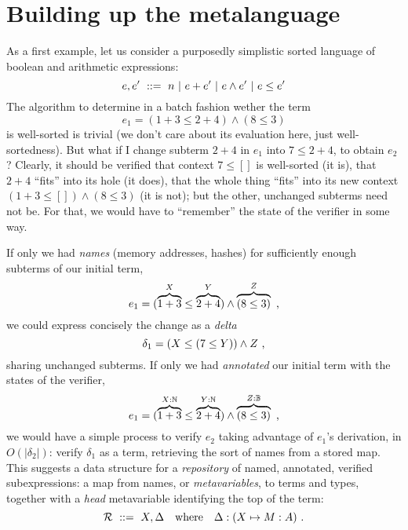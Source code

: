 \documentclass[9pt,authoryear]{sigplanconf}
\begin{document}
\section{Building up the metalanguage}

As a first example, let us consider a purposedly simplistic sorted
language of boolean and arithmetic expressions:
$$ e, e' \ ::=\  n \ |\  e + e' \ |\  e \land e' \ |\  e \leq e' $$
The algorithm to determine in a batch fashion wether the term
$$ e_1 = (1 + 3 \leq 2 + 4) \land (8 \leq 3) $$
is well-sorted is trivial (we don't care about its evaluation here,
just well-sortedness). But what if I change subterm $2+4$ in $e_1$
into $7 \leq 2+4$, to obtain $e_2$? Clearly, it should be verified
that context $7\leq []$ is well-sorted (it is), that $2+4$ ``fits''
into its hole (it does), that the whole thing ``fits'' into its new
context $(1+3\leq [])\land(8\leq 3)$ (it is not); but the other,
unchanged subterms need not be. For that, we would have to
``remember'' the state of the verifier in some way.

If only we had \emph{names} (memory addresses, hashes) for
sufficiently enough subterms of our initial term, $$ e_1 =
(\overbrace{1 + 3}^\mmeta \leq \overbrace{2+4}^\mmmeta) \land
\overbrace{(8 \leq 3)}^\mmmmeta\text{\ ,} $$ we could express
concisely the change as a \emph{delta} $$\delta_1 = (\mmeta\leq(7\leq
\mmmeta))\land \mmmmeta \text{\ ,}$$ sharing unchanged subterms. If
only we had \emph{annotated} our initial term with the states of the
verifier,
$$e_1 = (\overbrace{1 + 3}^{\mmeta:\nat} \leq \overbrace{2 + 4}^{\mmmeta:\nat}) \land
\overbrace{(8 \leq 3)}^{\mmmmeta:\bool}\text{\ ,} $$ we would have a
simple process to verify $e_2$ taking advantage of $e_1$'s derivation,
in $O(|\delta_2|)$: verify $\delta_1$ as a term, retrieving the sort
of names from a stored map. This suggests a data structure for a
\emph{repository} of named, annotated, verified subexpressions: a map
from names, or \emph{metavariables}, to terms and types, together with
a \emph{head} metavariable identifying the top of the term: $$\mr
\gequal X, \Delta \quad\text{where}\quad \Delta : (\mmeta\mapsto M :
A) \text{\ .}$$
\end{document}
